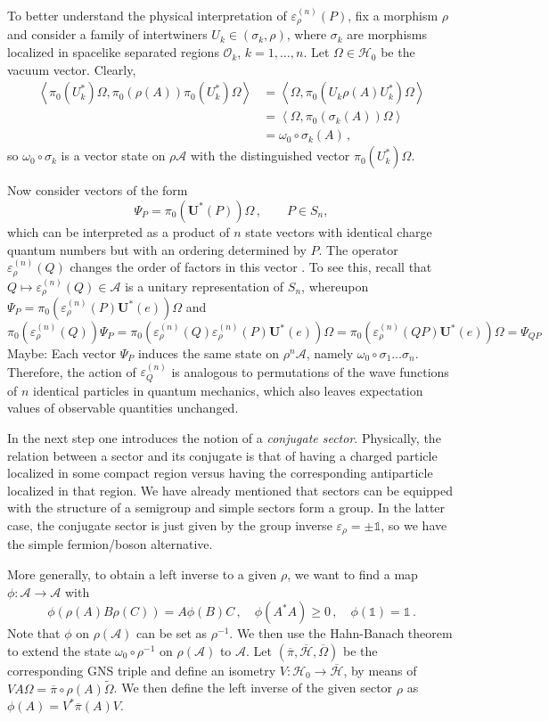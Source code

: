 \documentclass[12pt,a4paper]{article}
\newcommand{\1}{\mathds{1}}                         %
\newcommand{\Hcal}{\mathcal {H}}
\newcommand{\Ocal}{\mathcal{O}}
\newcommand{\Ac}{{\mathcal{A}}}
\begin{document}
To better understand the physical interpretation of $\varepsilon^{(n)}_\rho(P)$, fix a morphism $\rho$ and consider a family of intertwiners $U_k\in(\sigma_k,\rho)$, where $\sigma_k$ are morphisms localized in spacelike separated regions $\Ocal_k$, $k=1,\dots,n$. Let $\Omega\in\Hcal_0$ be 
the vacuum vector. Clearly,
\begin{align*}
\left<\pi_0(U_k^*)\Omega,\pi_0(\rho(A)) \pi_0(U_k^*)\Omega\right>
  &=\left<\Omega,\pi_0(U_k\rho(A)U_k^*)\Omega\right>\\
  &=\left<\Omega,\pi_0(\sigma_k(A)) \Omega\right>\\
  &=\omega_0\circ \sigma_k(A)\,,
\end{align*}
so $\omega_0\circ\sigma_k$ is a vector state on $\rho\Ac$ with the distinguished vector $\pi_0(U_k^*)\Omega$.

Now consider vectors of the form
\[
\Psi_P=\pi_0(\boldsymbol{U}^*(P))\Omega\,, \qquad P\in S_n,
\]
which can be interpreted as a product of $n$ state vectors with
identical charge quantum numbers but with an ordering determined by $P$. The operator  $\varepsilon^{(n)}_\rho(Q)$ changes the order of factors in this vector \cite{DHR3}. To see this, recall that
$Q\mapsto \varepsilon^{(n)}_\rho(Q)\in\Ac$ is a unitary representation of $S_n$, whereupon $\Psi_P=\pi_0( \varepsilon^{(n)}_\rho(P)  \boldsymbol{U}^*(e))\Omega$ and
\[\pi_0( \varepsilon^{(n)}_\rho(Q))\Psi_P=\pi_0(\varepsilon^{(n)}_\rho(Q) \varepsilon^{(n)}_\rho(P)\boldsymbol{U}^*(e))\Omega = \pi_0(\varepsilon^{(n)}_\rho(QP)\boldsymbol{U}^*(e))\Omega=\Psi_{QP}
\]
Maybe: Each vector $\Psi_P$ induces the same state on $\rho^n\Ac$, namely $\omega_0\circ \sigma_1\dots\sigma_n$. Therefore, the action of $\varepsilon^{(n)}_Q$ is analogous to permutations of the wave functions of $n$ identical particles in quantum mechanics, which also leaves expectation values of observable quantities unchanged.

In the next step one introduces the notion of a \emph{conjugate sector}. Physically, the relation between a sector and its conjugate is that of having a charged particle localized in some compact region versus having the corresponding antiparticle localized in that region. We have already mentioned that sectors can be equipped with the structure of a semigroup and simple sectors form a group. In the latter case, the conjugate sector is just given by the group inverse $\varepsilon_\rho=\pm \1$, so we have the simple fermion/boson alternative.

More generally, to  obtain a left inverse to a given $\rho$, we want to find a map $\phi:\Ac\rightarrow \Ac$ with
\[
\phi(\rho(A)B\rho(C))=A\phi(B)C\,,\quad \phi(A^*A)\geq0\,,\quad \phi(\1)=\1\,.
\]
Note that $\phi$ on $\rho(\Ac)$ can be set as $\rho^{-1}$. We then use the Hahn-Banach theorem to extend the state $\omega_0\circ \rho^{-1}$ on $\rho(\Ac)$ to $\Ac$. Let $(\overline{\pi},\overline{\Hcal}, \overline{\Omega})$ be the corresponding GNS triple and define an isometry $V:\Hcal_{0}\rightarrow \overline{\Hcal}$, by means of
$VA\Omega=\overline{\pi}\circ \rho(A)\tilde{\Omega}$. We then define the left inverse of the given sector $\rho$ as $\phi(A)=V^* \overline{\pi}(A) V$. 
\end{document}
